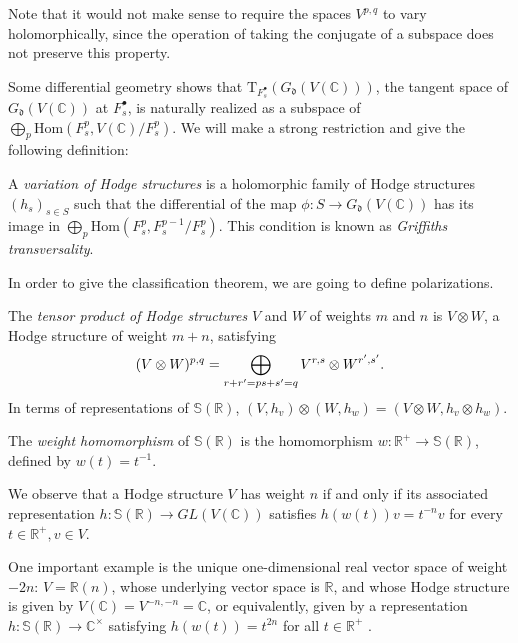 Note that it would not make sense to require the spaces $V^{p,q}$ to vary holomorphically, since the operation of taking the conjugate of a subspace does not preserve this property.


Some differential geometry shows that $\text{T}_{F_s^\bullet}(G_\mathfrak d (V(\mathbb C)))$, the tangent space of $G_\mathfrak d (V(\mathbb C))$ at $F_s^\bullet$, is naturally realized as a subspace of $\bigoplus _p \text{Hom}(F_s^p ,V(\mathbb C)/F_s^p)$. We will make a strong restriction and give the following definition:

\begin{definition}
 \label{definition-variation-of-Hodge-structures}
 A {\it variation of Hodge structures} is a holomorphic family of Hodge structures $(h_s)_{s \in S}$ such that the differential of the map $\phi:S \to G_\mathfrak d (V(\mathbb C))$ has its image in $\bigoplus _p \text{Hom}(F_s^p ,F_s^{p-1}/F_s^p)$. This condition is known as {\it Griffiths transversality}.
\end{definition}

In order to give the classification theorem, we are going to define polarizations.

\begin{definition}
 \label{definition-tensor-product}
 The {\it tensor product of Hodge structures} $V$ and $W$ of weights $m$ and $n$ is $V \otimes W$, a Hodge structure of weight $m+n$, satisfying 
$$
(V\otimes W)^{p,q}=\bigoplus_{r+r'=p \\ s+s'=q} V^{r,s} \otimes W^{r',s'}.
$$
In terms of representations of $\mathbb S(\mathbb R)$, $(V,h_v)\otimes (W,h_w)=(V \otimes W, h_v \otimes h_w)$.
\end{definition}

\begin{definition}
 \label{definition-weight-homomorphism}
 The {\it weight homomorphism} of $\mathbb S(\mathbb R)$ is the homomorphism $w:\mathbb R ^+ \to \mathbb S(\mathbb R)$, defined by $w(t)=t^{-1}$.
 \end{definition}
 
 We observe that a Hodge structure $V$ has weight $n$  if and only if its associated representation $h:\mathbb S(\mathbb R) \to GL(V(\mathbb C))$ satisfies $h(w(t))v=t^{-n} v$ for every $t\in \mathbb R^+, v\in V$.

One important example is the unique one-dimensional real vector space of weight $-2n$: $V=\mathbb R(n)$, whose underlying vector space is $\mathbb R$, and whose Hodge structure is given by $V(\mathbb C)=V^{-n,-n}=\mathbb C$, or equivalently, given by a representation $h:\mathbb S(\mathbb R) \to \mathbb C^ \times$ satisfying $h(w(t))=t^{2n}$ for all $t \in \mathbb R^+$ .

